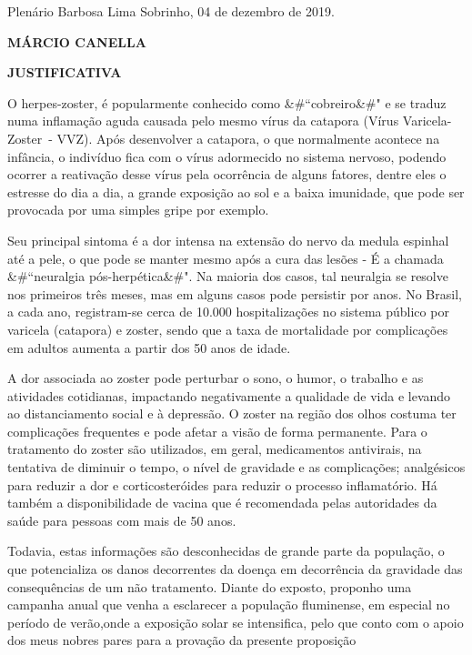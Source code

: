 \documentclass[10pt]{article}
\begin{document}
\begin{center}
  Plenário Barbosa Lima Sobrinho, 04 de dezembro de 2019.

   \bigskip

  \textbf{ MÁRCIO CANELLA}

  \bigskip

  \textbf{JUSTIFICATIVA}
  \bigskip

\end{center}

  

O herpes-zoster, é popularmente conhecido como &#``cobreiro&#" e se traduz numa inflamação aguda causada pelo mesmo vírus da catapora (Vírus Varicela-Zoster - VVZ).  Após desenvolver a catapora, o que normalmente acontece na infância, o indivíduo fica com o vírus adormecido no sistema nervoso, podendo ocorrer a reativação desse vírus pela ocorrência de alguns fatores, dentre eles o estresse do dia a dia, a grande exposição ao sol e a baixa imunidade, que pode ser provocada por uma simples gripe por exemplo.

Seu principal sintoma é a dor intensa na extensão do nervo da medula espinhal até a pele, o que pode se manter mesmo após a cura das lesões - É a chamada &#``neuralgia pós-herpética&#".  Na maioria dos casos, tal neuralgia se resolve nos primeiros três meses, mas em alguns casos pode persistir por anos.  No Brasil, a cada ano, registram-se cerca de 10.000 hospitalizações no sistema público por varicela (catapora) e zoster, sendo que a taxa de mortalidade por complicações em adultos aumenta a partir dos 50 anos de idade.

A dor associada ao zoster pode perturbar o sono, o humor, o trabalho e as atividades cotidianas, impactando negativamente a qualidade de vida e levando ao distanciamento social e à depressão. O zoster na região dos olhos costuma ter complicações frequentes e pode afetar a visão de forma permanente.  Para o tratamento do zoster são utilizados, em geral, medicamentos antivirais, na tentativa de diminuir o tempo, o nível de gravidade e as complicações; analgésicos para reduzir a dor e corticosteróides para reduzir o processo inflamatório.  Há também a disponibilidade de vacina que é recomendada pelas autoridades da saúde para pessoas com mais de 50 anos.

Todavia, estas informações são desconhecidas de grande parte da população, o que potencializa os danos decorrentes da doença em decorrência da gravidade das consequências de um não tratamento.  Diante do exposto, proponho uma campanha anual que venha a esclarecer a população fluminense, em especial no período de verão,onde a exposição solar se intensifica, pelo que conto com o apoio dos meus nobres pares para a provação da presente proposição



\iffalse
\begin{center}
  \textbf{REFERÊNCIAS}
\end{center}


\fi
\end{document}

